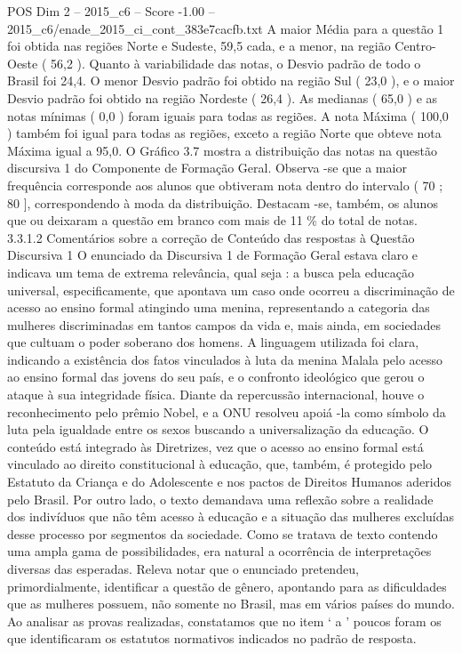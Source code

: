\begin{textsample}{POS Dim 2 – 2015\_c6 – Score -1.00 – 2015\_c6/enade\_2015\_ci\_cont\_383e7cacfb.txt}
A maior Média para a questão 1 foi obtida nas regiões Norte e Sudeste, 59,5 cada, e a menor, na região Centro-Oeste ( 56,2 ).
Quanto à variabilidade das notas, o Desvio padrão de todo o Brasil foi 24,4.
O menor Desvio padrão foi obtido na região Sul ( 23,0 ), e o maior Desvio padrão foi obtido na região Nordeste ( 26,4 ).
As medianas ( 65,0 ) e as notas mínimas ( 0,0 ) foram iguais para todas as regiões.
A nota Máxima ( 100,0 ) também foi igual para todas as regiões, exceto a região Norte que obteve nota Máxima igual a 95,0.
O Gráfico 3.7 mostra a distribuição das notas na questão discursiva 1 do Componente de Formação Geral.
Observa -se que a maior frequência corresponde aos alunos que obtiveram nota dentro do intervalo ( 70 ; 80 ], correspondendo à moda da distribuição.
Destacam -se, também, os alunos que ou deixaram a questão em branco com mais de 11 \% do total de notas. 3.3.1.2 Comentários sobre a correção de Conteúdo das respostas à Questão Discursiva 1 O enunciado da Discursiva 1 de Formação Geral estava claro e indicava um tema de extrema relevância, qual seja : a busca pela educação universal, especificamente, que apontava um caso onde ocorreu a discriminação de acesso ao ensino formal atingindo uma menina, representando a categoria das mulheres discriminadas em tantos campos da vida e, mais ainda, em sociedades que cultuam o poder soberano dos homens.
A linguagem utilizada foi clara, indicando a existência dos fatos vinculados à luta da menina Malala pelo acesso ao ensino formal das jovens do seu país, e o confronto ideológico que gerou o ataque à sua integridade física.
Diante da repercussão internacional, houve o reconhecimento pelo prêmio Nobel, e a ONU resolveu apoiá -la como símbolo da luta pela igualdade entre os sexos buscando a universalização da educação.
O conteúdo está integrado às Diretrizes, vez que o acesso ao ensino formal está vinculado ao direito constitucional à educação, que, também, é protegido pelo Estatuto da Criança e do Adolescente e nos pactos de Direitos Humanos aderidos pelo Brasil.
Por outro lado, o texto demandava uma reflexão sobre a realidade dos indivíduos que não têm acesso à educação e a situação das mulheres excluídas desse processo por segmentos da sociedade.
Como se tratava de texto contendo uma ampla gama de possibilidades, era natural a ocorrência de interpretações diversas das esperadas.
Releva notar que o enunciado pretendeu, primordialmente, identificar a questão de gênero, apontando para as dificuldades que as mulheres possuem, não somente no Brasil, mas em vários países do mundo.
Ao analisar as provas realizadas, constatamos que no item ‘ a ’ poucos foram os que identificaram os estatutos normativos indicados no padrão de resposta.

\end{textsample}
